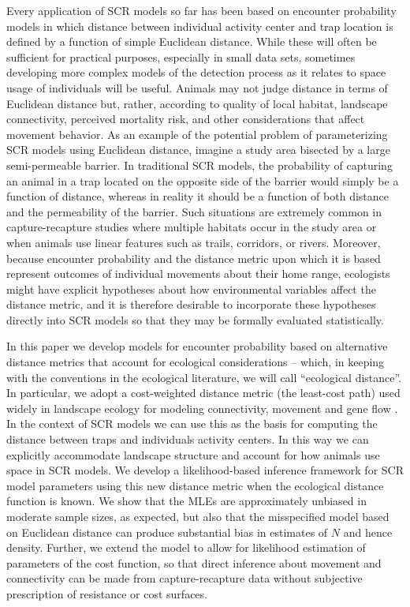 \documentclass[12pt]{article}
\begin{document}
\begin{spacing}{1.8}
Every application of SCR models so far has been based on encounter
probability models in which distance between individual activity
center and trap location is defined by a function of simple Euclidean
distance.  While these will often be sufficient for practical
purposes, especially in small data sets, sometimes developing more
complex models of the detection process as it relates to space usage
of individuals will be useful.  Animals may not judge distance in
terms of Euclidean distance but, rather, according to quality of local
habitat, landscape connectivity, perceived mortality risk, and other
considerations that affect movement behavior.
As an example of the potential problem of parameterizing SCR models
using Euclidean distance, imagine a study area bisected by a large
semi-permeable barrier. In traditional SCR models, the probability of
capturing an animal in a trap located on the opposite side of the
barrier would simply be a function of distance, whereas in reality it
should be a function of both distance and the permeability of the
barrier. Such situations are extremely common in capture-recapture
studies where multiple habitats occur in the study area or when
animals use linear features such as trails, corridors, or rivers.
 Moreover, because encounter probability and the distance
metric upon which it is based represent outcomes of individual
movements about their home range, ecologists might have explicit
hypotheses about how environmental variables affect the distance
metric, and it is therefore desirable to incorporate these hypotheses
directly into SCR models so that they may be formally evaluated
statistically.

In this paper we develop models for encounter probability based on
alternative distance metrics that account for ecological
considerations -- which, in keeping with the conventions in the
ecological literature, we will call ``ecological distance''. In
particular, we adopt a cost-weighted distance metric (the least-cost path)
used widely in landscape ecology for modeling connectivity,
movement and gene flow
\citep{adriaensen_etal:2003,manel_etal:2003,mcrae_etal:2008}. In the
context of SCR models we can use this as the basis for computing the
distance between traps and individuals activity centers. In this way
we can explicitly accommodate landscape structure and
account for how animals use space in SCR models. We develop a
likelihood-based inference framework for SCR model parameters using
this new distance metric when the ecological distance function is
known.  We show that the MLEs are approximately unbiased in moderate
sample sizes, as expected, but also that the misspecified model based
on Euclidean distance can produce substantial bias in estimates of $N$
and hence density.  Further, we extend the model to allow for likelihood
estimation of parameters of the cost function, so that direct inference
about movement and connectivity can be made from capture-recapture data without subjective prescription
of resistance or cost surfaces.



\end{spacing}
\end{document}
